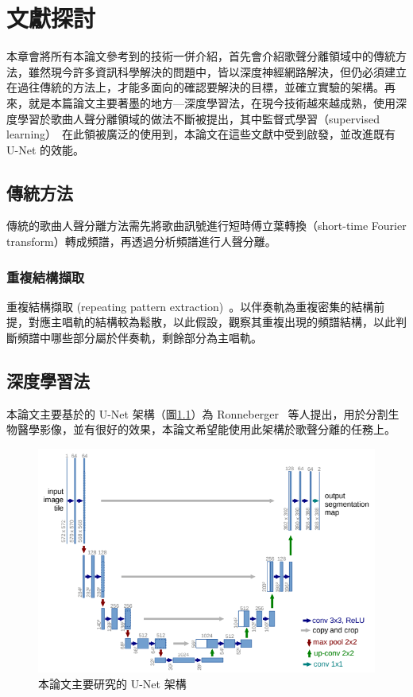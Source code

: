 \chapter{文獻探討}
本章會將所有本論文參考到的技術一併介紹，首先會介紹歌聲分離領域中的傳統方法，雖然現今許多資訊科學解決的問題中，皆以深度神經網路解決，但仍必須建立在過往傳統的方法上，才能多面向的確認要解決的目標，並確立實驗的架構。再來，就是本篇論文主要著墨的地方—深度學習法，在現今技術越來越成熟，使用深度學習於歌曲人聲分離領域的做法不斷被提出，其中監督式學習（supervised learning）~\cite{kotsiantis2007supervised}在此領被廣泛的使用到，本論文在這些文獻中受到啟發，並改進既有 U-Net 的效能。

\section{傳統方法}
傳統的歌曲人聲分離方法需先將歌曲訊號進行短時傅立葉轉換（short-time Fourier transform）轉成頻譜，再透過分析頻譜進行人聲分離。

\subsection{重複結構擷取}
重複結構擷取 (repeating pattern extraction)~\cite{rafii2012repeating}。以伴奏軌為重複密集的結構前提，對應主唱軌的結構較為鬆散，以此假設，觀察其重複出現的頻譜結構，以此判斷頻譜中哪些部分屬於伴奏軌，剩餘部分為主唱軌。

\section{深度學習法}
本論文主要基於的 U-Net 架構（圖\ref{ronneberger1}）為 Ronneberger~\cite{ronneberger2015u} 等人提出，用於分割生物醫學影像，並有很好的效果，本論文希望能使用此架構於歌聲分離的任務上。

\begin{figure}[htbp]
    \hfil
    \begin{minipage}[t]{1.0\textwidth}
        \includegraphics{./figures/chapter02_method/ronneberger1.png}
        \centering
        \caption {本論文主要研究的 U-Net 架構}
        \label{ronneberger1}
    \end{minipage}
    \hfil
\end{figure}

